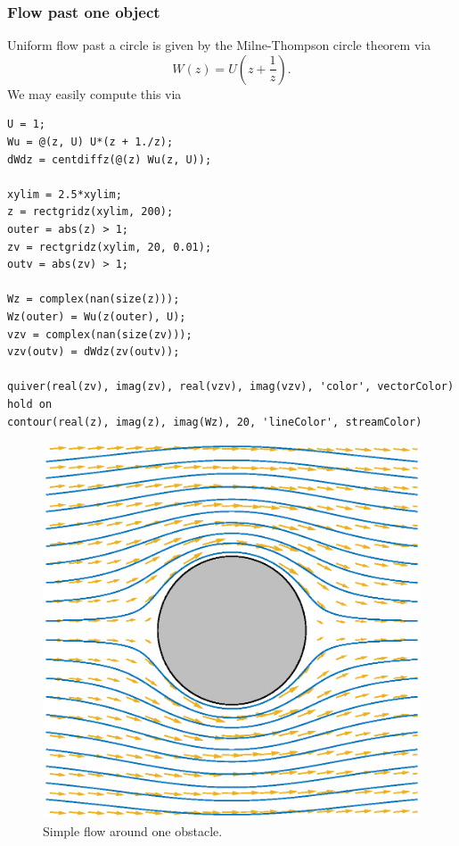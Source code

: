 \documentclass[12pt,fleqn]{article}
\begin{document}
\subsubsection{Flow past one object}
Uniform flow past a circle is given by the Milne-Thompson circle theorem via
\begin{equation*}
  W(z) = U\left( z + \frac{1}{z} \right).
\end{equation*}
We may easily compute this via
\begin{lstlisting}
U = 1;
Wu = @(z, U) U*(z + 1./z);
dWdz = centdiffz(@(z) Wu(z, U));

xylim = 2.5*xylim;
z = rectgridz(xylim, 200);
outer = abs(z) > 1;
zv = rectgridz(xylim, 20, 0.01);
outv = abs(zv) > 1;

Wz = complex(nan(size(z)));
Wz(outer) = Wu(z(outer), U);
vzv = complex(nan(size(zv)));
vzv(outv) = dWdz(zv(outv));

quiver(real(zv), imag(zv), real(vzv), imag(vzv), 'color', vectorColor)
hold on
contour(real(z), imag(z), imag(Wz), 20, 'lineColor', streamColor)
\end{lstlisting}
\begin{figure}[htb]
  \centering
  \includegraphics[height=.4\textheight]{figures/aroundone}
  \caption{Simple flow around one obstacle.}
  \label{fig:aroundone}
\end{figure}
\end{document}
